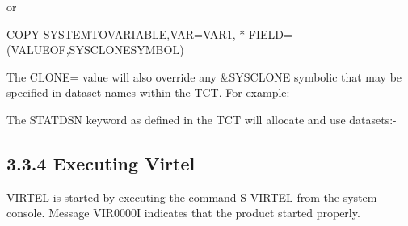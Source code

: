 \documentclass[letterpaper,10pt,english]{sphinxmanual}
\begin{document}
\begin{sphinxVerbatim}[commandchars=\\\{\}]
 
\end{sphinxVerbatim}

or

\begin{sphinxVerbatim}[commandchars=\\\{\}]
COPY\PYGZdl{} SYSTEM\PYGZhy{}TO\PYGZhy{}VARIABLE,VAR=\PYGZsq{}VAR1\PYGZsq{},                    *
  FIELD=(VALUE\PYGZhy{}OF,SYSCLONE\PYGZhy{}SYMBOL)
\end{sphinxVerbatim}

The CLONE= value will also override any \&SYSCLONE symbolic that may be specified in dataset names within the TCT. For example:-

\begin{sphinxVerbatim}[commandchars=\\\{\}]
                  
                          
\end{sphinxVerbatim}

The STATDSN keyword as defined in the TCT will allocate and use datasets:-

\begin{sphinxVerbatim}[commandchars=\\\{\}]
  
\end{sphinxVerbatim}


\subsection{3.3.4 Executing Virtel}
\label{\detokenize{Installation_Guide:executing-virtel}}
VIRTEL is started by executing the command S VIRTEL from the system console. Message VIR0000I indicates that the product started properly.
\end{document}

